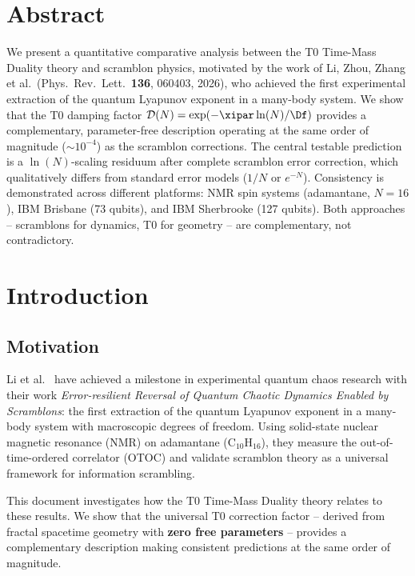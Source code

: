 \section*{Abstract}
We present a quantitative comparative analysis between the T0 Time-Mass Duality theory and scramblon physics, motivated by the work of Li, Zhou, Zhang et al.\ (Phys.\ Rev.\ Lett.\ \textbf{136}, 060403, 2026), who achieved the first experimental extraction of the quantum Lyapunov exponent in a many-body system. We show that the T0 damping factor $\mathcal{D}(N) = \exp(-\xipar \ln(N)/\Df)$ provides a complementary, parameter-free description operating at the same order of magnitude ($\sim 10^{-4}$) as the scramblon corrections. The central testable prediction is a $\ln(N)$-scaling residuum after complete scramblon error correction, which qualitatively differs from standard error models ($1/N$ or $e^{-N}$). Consistency is demonstrated across different platforms: NMR spin systems (adamantane, $N=16$), IBM Brisbane (73 qubits), and IBM Sherbrooke (127 qubits). Both approaches -- scramblons for dynamics, T0 for geometry -- are complementary, not contradictory.

\clearpage

\section{Introduction}
\label{sec:intro}

\subsection{Motivation}

Li et al.\ \cite{li_scramblons_2026} have achieved a milestone in experimental quantum chaos research with their work \emph{Error-resilient Reversal of Quantum Chaotic Dynamics Enabled by Scramblons}: the first extraction of the quantum Lyapunov exponent in a many-body system with macroscopic degrees of freedom. Using solid-state nuclear magnetic resonance (NMR) on adamantane (C$_{10}$H$_{16}$), they measure the out-of-time-ordered correlator (OTOC) and validate scramblon theory as a universal framework for information scrambling.

This document investigates how the T0 Time-Mass Duality theory \cite{pascher_t0_2025} relates to these results. We show that the universal T0 correction factor -- derived from fractal spacetime geometry with \textbf{zero free parameters} -- provides a complementary description making consistent predictions at the same order of magnitude.

